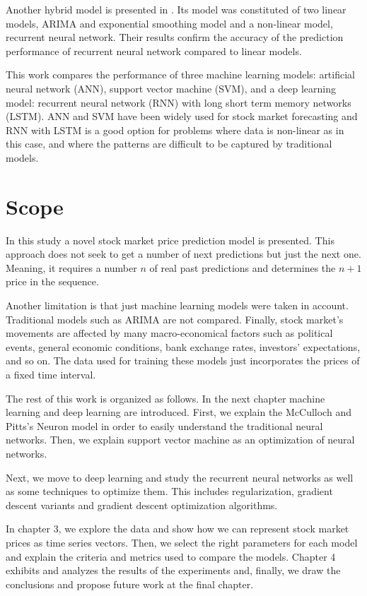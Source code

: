 Another hybrid model is presented in \cite{rather2015recurrent}. Its model was constituted of two linear models,  ARIMA and exponential smoothing model and a non-linear model, recurrent neural network. Their results confirm the accuracy of the prediction performance of recurrent neural network compared to linear models.

This work compares the performance of three machine learning models: artificial neural network (ANN), support vector machine (SVM), and a deep learning model: recurrent neural network (RNN) with long short term memory networks (LSTM). ANN and SVM have been widely used for stock market forecasting and RNN with LSTM is a good option for problems where data is non-linear  as in this case, and where the patterns are difficult to be captured by traditional models.

\section{Scope}
In this study a novel stock market price prediction model is presented. This approach does not seek to get a number of next predictions but just the next one. Meaning, it requires a number $n$ of real past predictions and determines the $n+1$ price in the sequence. 

Another limitation is that just machine learning models were taken in account. Traditional models such as ARIMA are not compared. Finally, stock market’s movements are affected by many macro-economical factors such as political events, general economic conditions, bank exchange rates, investors’ expectations, and so on. The data used for training these models just incorporates the prices of a fixed time interval.

The rest of this work is organized as follows. In the next chapter machine learning and deep learning are introduced. First, we explain the McCulloch and Pitts's Neuron model in order to easily understand the traditional neural networks. Then, we explain support vector machine as an optimization of neural networks.

Next, we move to deep learning and study the recurrent neural networks as well as some techniques to optimize them. This includes regularization, gradient descent variants and gradient descent optimization algorithms.  

In  chapter 3, we explore the data and show how we can represent stock market prices as time series vectors. Then, we select the right parameters for each model and explain the criteria and metrics used to compare the models. Chapter 4 exhibits and analyzes  the results of the experiments and, finally, we draw the conclusions and propose future work at the final chapter.

